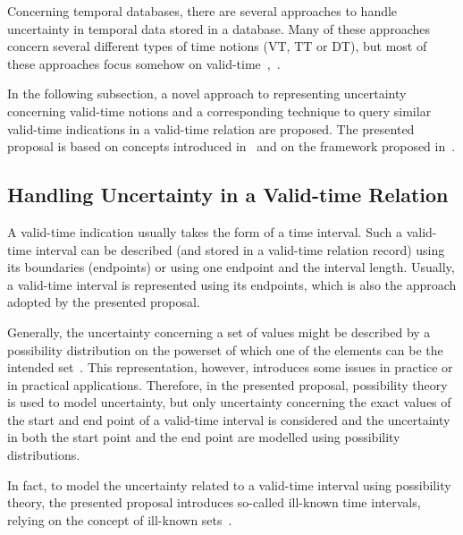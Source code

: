 Concerning temporal databases, there are several approaches to handle uncertainty in temporal data stored in a database. Many of these approaches concern several different types of time notions (VT, TT or DT), but most of these approaches focus somehow on valid-time~\cite{garrido2009},~\cite{gal01}.

In the following subsection, a novel approach to representing uncertainty concerning valid-time notions and a corresponding technique to query similar valid-time indications in a valid-time relation are proposed. The presented proposal is based on concepts introduced in~\cite{Dubois88b} and on the framework proposed in~\cite{Pon11}.

\subsection{Handling Uncertainty in a Valid-time Relation}
A valid-time indication usually takes the form of a time interval. Such a valid-time interval can be described (and stored in a valid-time relation record) using its boundaries (endpoints) or using one endpoint and the interval length. Usually, a valid-time interval is represented using its endpoints, which is also the approach adopted by the presented proposal. 

Generally, the uncertainty concerning a set of values might be described by a possibility distribution on the powerset of which one of the elements can be the intended set~\cite{Dubois88b}. This representation, however, introduces some issues in practice or in practical applications. Therefore, in the presented proposal, possibility theory is used to model uncertainty, but only uncertainty concerning the exact values of the start and end point of a valid-time interval is considered and the uncertainty in both the start point and the end point are modelled using possibility distributions.

In fact, to model the uncertainty related to a valid-time interval using possibility theory, the presented proposal introduces so-called ill-known time intervals, relying on the concept of ill-known sets~\cite{Dubois88b}.


